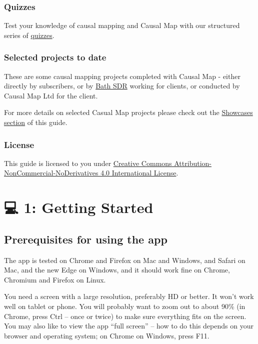 \documentclass[
]{book}
\begin{document}
\hypertarget{quizzes}{%
\section{Quizzes}\label{quizzes}}

Test your knowledge of causal mapping and Causal Map with our structured series of \href{https://causalmap.shinyapps.io/quizzes/}{quizzes}.

\hypertarget{selected-projects-to-date}{%
\section{Selected projects to date}\label{selected-projects-to-date}}

These are some causal mapping projects completed with Causal Map - either directly by subscribers, or by \href{https://bathsdr.org}{Bath SDR} working for clients, or conducted by Causal Map Ltd for the client.

For more details on selected Casual Map projects please check out the \protect\hyperlink{xshowcases}{Showcases section} of this guide.

\hypertarget{license}{%
\section*{License}\label{license}}

This guide is licensed to you under \href{http://creativecommons.org/licenses/by-nc-nd/4.0/}{Creative Commons Attribution-NonCommercial-NoDerivatives 4.0 International License}.

\hypertarget{part-1-getting-started}{%
\part{💻 1: Getting Started}\label{part-1-getting-started}}

\hypertarget{prerequisites-for-using-the-app}{%
\chapter{Prerequisites for using the app}\label{prerequisites-for-using-the-app}}

The app is tested on Chrome and Firefox on Mac and Windows, and Safari on Mac, and the new Edge on Windows, and it should work fine on Chrome, Chromium and Firefox on Linux.

You need a screen with a large resolution, preferably HD or better. It won't work well on tablet or phone. You will probably want to zoom out to about 90\% (in Chrome, press Ctrl -- once or twice) to make sure everything fits on the screen. You may also like to view the app ``full screen'' -- how to do this depends on your browser and operating system; on Chrome on Windows, press F11.
\end{document}
